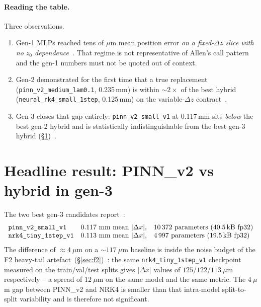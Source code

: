 \documentclass[11pt,a4paper]{article}
\begin{document}
\paragraph{Reading the table.} Three observations.
\begin{enumerate}
\item Gen-1 MLPs reached tens of $\mu$m mean position error
      \emph{on a fixed-$\Delta z$ slice with no $z_0$
      dependence}~\cite{gen1eval}. That regime is not
      representative of Allen's call pattern and the gen-1 numbers
      must not be quoted out of context.
\item Gen-2 demonstrated for the first time that a true replacement
      (\texttt{pinn\_v2\_medium\_lam0.1}, 0.235\,mm) is within $\sim
      2\times$ of the best hybrid
      (\texttt{neural\_rk4\_small\_1step}, 0.125\,mm) on the
      variable-$\Delta z$ contract~\cite{gen2readme}.
\item Gen-3 closes that gap entirely: \texttt{pinn\_v2\_small\_v1}
      at 0.117\,mm sits \emph{below} the best gen-2 hybrid and is
      statistically indistinguishable from the best gen-3 hybrid
      (\S\ref{sec:headline})~\cite{gen3readme}.
\end{enumerate}

\section{Headline result: PINN\_v2 vs hybrid in gen-3}\label{sec:headline}

The two best gen-3 candidates report~\cite{gen3readme}:
\[
\begin{array}{lrl}
\texttt{pinn\_v2\_small\_v1} & 0.117~\text{mm mean }|\Delta x|,
                              & 10\,372~\text{parameters (40.5\,kB fp32)} \\
\texttt{nrk4\_tiny\_1step\_v1} & 0.113~\text{mm mean }|\Delta x|,
                              & 4\,997~\text{parameters (19.5\,kB fp32)} \\
\end{array}
\]
The difference of $\approx 4~\mu$m on a $\sim 117~\mu$m baseline is
inside the noise budget of the F2 heavy-tail
artefact~(\S\ref{sec:f2})~\cite{gen3readme}: the same
\texttt{nrk4\_tiny\_1step\_v1} checkpoint measured on the
train/val/test splits gives $|\Delta x|$ values of $125$/$122$/$113~\mu$m
respectively -- a spread of $12~\mu$m on the same model and the same
metric. The $4~\mu$m gap between PINN\_v2 and NRK4 is smaller than
that intra-model split-to-split variability and is therefore not
significant.
\end{document}
